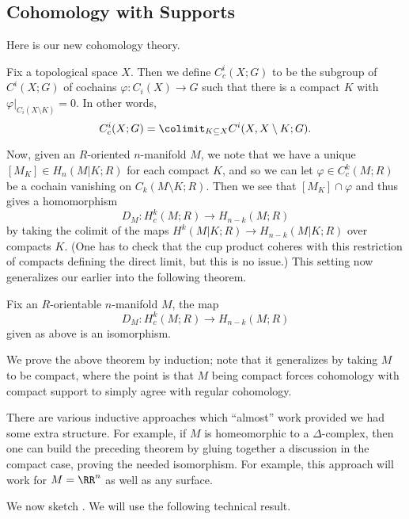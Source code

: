 \documentclass[../notes.tex]{subfiles}
\begin{document}
\subsection{Cohomology with Supports}
Here is our new cohomology theory.
\begin{definition}
	Fix a topological space $X$. Then we define $C^i_c(X;G)$ to be the subgroup of $C^i(X;G)$ of cochains $\varphi\colon C_i(X)\to G$ such that there is a compact $K$ with $\varphi|_{C_i(X\setminus K)}=0$. In other words,
	\[C^i_c(X;G)=\colimit_{K\subseteq X}C^i(X,X\setminus K;G).\]
\end{definition}
Now, given an $R$-oriented $n$-manifold $M$, we note that we have a unique $[M_K]\in H_n(M|K;R)$ for each compact $K$, and so we can let $\varphi\in C_c^k(M;R)$ be a cochain vanishing on $C_k(M\setminus K;R)$. Then we see that $[M_K]\cap\varphi$ and thus gives a homomorphism
\[D_M\colon H_c^k(M;R)\to H_{n-k}(M;R)\]
by taking the colimit of the maps $H^k(M|K;R)\to H_{n-k}(M|K;R)$ over compacts $K$. (One has to check that the cup product coheres with this restriction of compacts defining the direct limit, but this is no issue.) This setting now generalizes our earlier  into the following theorem.
\begin{theorem} \label{thm:pd-not-compact}
	Fix an $R$-orientable $n$-manifold $M$, the map
	\[D_M\colon H^k_c(M;R)\to H_{n-k}(M;R)\]
	given as above is an isomorphism.
\end{theorem}
We prove the above theorem by induction; note that it generalizes  by taking $M$ to be compact, where the point is that $M$ being compact forces cohomology with compact support to simply agree with regular cohomology.
\begin{remark}
	There are various inductive approaches which ``almost'' work provided we had some extra structure. For example, if $M$ is homeomorphic to a $\Delta$-complex, then one can build the preceding theorem by gluing together a discussion in the compact case, proving the needed isomorphism. For example, this approach will work for $M=\RR^n$ as well as any surface.
\end{remark}
We now sketch . We will use the following technical result.
\end{document}
